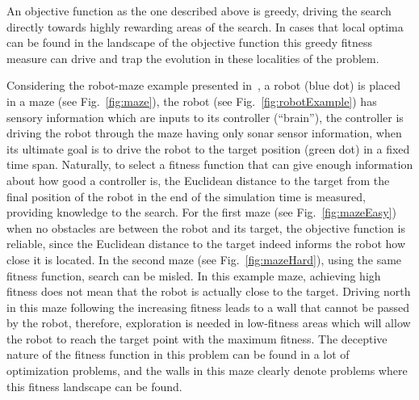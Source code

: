 An objective function as the one described above is greedy, driving the search directly towards highly rewarding areas of the search. In cases that local optima can be found in the landscape of the objective function this greedy fitness measure can drive and trap the evolution in these localities of the problem.

Considering the robot-maze example presented in~\citep{lehman2011abandoning,lehman2010revising}, a robot (blue dot) is placed in a maze (see Fig.~\ref{fig:maze}), the robot (see Fig.~\ref{fig:robotExample}) has sensory information which are inputs to its controller (``brain''), the controller is driving the robot through the maze having only sonar sensor information, when its ultimate goal is to drive the robot to the target position (green dot) in a fixed time span. Naturally, to select a fitness function that can give enough information about how good a controller is, the Euclidean distance to the target from the final position of the robot in the end of the simulation time is measured, providing knowledge to the search. For the first maze (see Fig.~\ref{fig:mazeEasy}) when no obstacles are between the robot and its target, the objective function is reliable, since the Euclidean distance to the target indeed informs the robot how close it is located. In the second maze (see Fig.~\ref{fig:mazeHard}), using the same fitness function, search can be misled. In this example maze, achieving high fitness does not mean that the robot is actually close to the target. Driving north in this maze following the increasing fitness leads to a wall that cannot be passed by the robot, therefore, exploration is needed in low-fitness areas which will allow the robot to reach the target point with the maximum fitness. The deceptive nature of the fitness function in this problem can be found in a lot of optimization problems, and the walls in this maze clearly denote problems where this fitness landscape can be found. 

